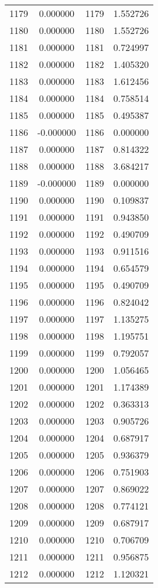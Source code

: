 \documentclass[12pt]{article}
\begin{document}
\begin{longtable}{@{}cccc@{}}
1179 & 0.000000 & 1179 & 1.552726 \\
1180 & 0.000000 & 1180 & 1.552726 \\
1181 & 0.000000 & 1181 & 0.724997 \\
1182 & 0.000000 & 1182 & 1.405320 \\
1183 & 0.000000 & 1183 & 1.612456 \\
1184 & 0.000000 & 1184 & 0.758514 \\
1185 & 0.000000 & 1185 & 0.495387 \\
1186 & -0.000000 & 1186 & 0.000000 \\
1187 & 0.000000 & 1187 & 0.814322 \\
1188 & 0.000000 & 1188 & 3.684217 \\
1189 & -0.000000 & 1189 & 0.000000 \\
1190 & 0.000000 & 1190 & 0.109837 \\
1191 & 0.000000 & 1191 & 0.943850 \\
1192 & 0.000000 & 1192 & 0.490709 \\
1193 & 0.000000 & 1193 & 0.911516 \\
1194 & 0.000000 & 1194 & 0.654579 \\
1195 & 0.000000 & 1195 & 0.490709 \\
1196 & 0.000000 & 1196 & 0.824042 \\
1197 & 0.000000 & 1197 & 1.135275 \\
1198 & 0.000000 & 1198 & 1.195751 \\
1199 & 0.000000 & 1199 & 0.792057 \\
1200 & 0.000000 & 1200 & 1.056465 \\
1201 & 0.000000 & 1201 & 1.174389 \\
1202 & 0.000000 & 1202 & 0.363313 \\
1203 & 0.000000 & 1203 & 0.905726 \\
1204 & 0.000000 & 1204 & 0.687917 \\
1205 & 0.000000 & 1205 & 0.936379 \\
1206 & 0.000000 & 1206 & 0.751903 \\
1207 & 0.000000 & 1207 & 0.869022 \\
1208 & 0.000000 & 1208 & 0.774121 \\
1209 & 0.000000 & 1209 & 0.687917 \\
1210 & 0.000000 & 1210 & 0.706709 \\
1211 & 0.000000 & 1211 & 0.956875 \\
1212 & 0.000000 & 1212 & 1.120321 \\

\end{longtable}
\end{document}
